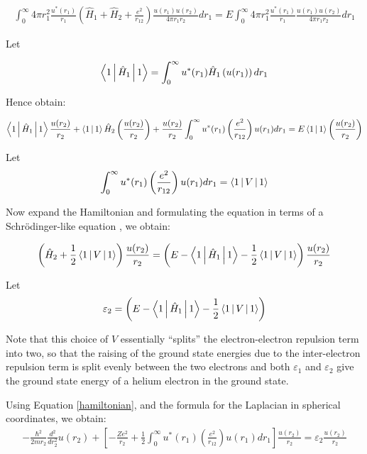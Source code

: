 \documentclass[11pt,letterpaper]{article}
\begin{document}
\begin{align}
\int_0^\infty 4\pi r_1^2 
\frac{u^*(r_1)}{r_1}
\left(\hat{H}_1 + \hat{H}_2 + \frac{e^2}{r_{12}}\right)
\frac{u(r_1)u(r_2)}{4\pi r_1r_2}
dr_1
=
E \int_0^\infty 4\pi r_1^2 
\frac{u^*(r_1)}{r_1}
\frac{u(r_1)u(r_2)}{4\pi r_1r_2}
dr_1
\end{align}

Let

\begin{align}
\Braket{1|\hat{H}_1|1} = 
\int_0^\infty 
u^*(r_1) \hat{H}_1\left(u(r_1)\right)
dr_1
\end{align}

Hence obtain:

\begin{align}
\Braket{1|\hat{H}_1|1}\frac{u(r_2)}{r_2} + 
\Braket{1|1}\hat{H}_2 \left(\frac{u(r_2)}{r_2}\right)+
\frac{u(r_2)}{r_2}\int_0^\infty u^*(r_1)
\left(\frac{e^2}{r_{12}}\right)u(r_1)dr_1
=
E \Braket{1|1} \left(\frac{u(r_2)}{r_2}\right)
\end{align}

Let 
\begin{align}
\int_0^\infty u^*(r_1)
 \left(\frac{e^2}{r_{12}}\right)u(r_1)dr_1
=
\Braket{1|V|1}
\end{align}


Now expand the Hamiltonian and formulating the equation in terms of a
Schr\"{o}dinger-like equation \cite[p.~69]{koonin90},
we obtain:

\begin{align}
\left(\hat{H}_2 + \frac{1}{2}\Braket{1|V|1} \right)\frac{u(r_2)}{r_2} = 
\left(E - \Braket{1|\hat{H}_1|1} - \frac{1}{2}\Braket{1|V|1}\right)
\frac{u(r_2)}{r_2}
\end{align}

Let
\begin{align}
\varepsilon_2 = \left(E - \Braket{1|\hat{H}_1|1} - 
\frac{1}{2}\Braket{1|V|1}\right)
\end{align}

Note that this choice of $V$ essentially ``splits'' the
electron-electron repulsion term into two, so that
the raising of the ground state energies due to the inter-electron
repulsion term is split evenly between the two electrons and
both $\varepsilon_1$ and $\varepsilon_2$ give the ground state energy of a
helium electron in the ground state.

Using Equation \eqref{hamiltonian}, and the formula for the Laplacian
in spherical coordinates, we obtain:
\begin{align}
-\frac{\hbar^2}{2mr_2}\frac{d^2}{dr_2^2} u(r_2)
+\left[
- \frac{Ze^2}{r_2}
 + \frac{1}{2}\int_0^\infty u^*(r_1) \left(\frac{e^2}{r_{12}}\right)u(r_1)dr_1
\right]
\frac{u(r_2)}{r_2}
=
\varepsilon_2 \frac{u(r_2)}{r_2}
\end{align}
\end{document}
